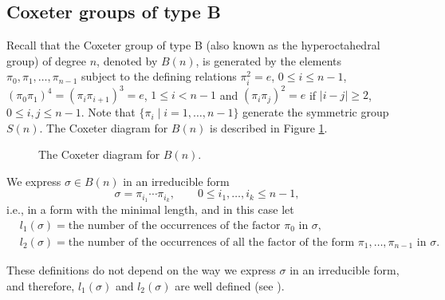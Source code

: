 \documentclass[11pt]{article}
\numberwithin{equation}{section}
\numberwithin{equation}{section}
\begin{document}
\subsection{Coxeter groups of type B}
Recall that the Coxeter
group of type B (also known as the hyperoctahedral group) of degree $n$, denoted by $B(n)$, is generated
by the elements $\pi_0, \pi_1, \dots , \pi_{n-1}$ subject to the defining relations $\pi_i^2=e$, $0\leq i \leq n-1$, $(\pi_0\pi_1)^4=(\pi_i \pi_{i+1})^3=e$, $1\leq i < n-1$ and $(\pi_i \pi_j)^2=e$ if $|i-j|\geq2$, $0\leq i,j\leq n-1$. Note that $\{\pi_i\mid i=1,\dots,n-1\}$ generate the symmetric group $S(n)$.
The Coxeter diagram for $B(n)$ is described in Figure \ref{fig:BN}.
\begin{figure}[htp]
\centering
		\caption{The Coxeter diagram for $B(n)$.}
		\label{fig:BN}
\end{figure}


We express $\sigma \in B(n)$ in an irreducible form
\[
\sigma=\pi_{i_1} \cdots \pi_{i_{k}}, \qquad 0\leq i_1,\dots,i_k \leq n-1,
\]
i.e., in a form with the minimal length, and in this case let
\begin{align*}
	&l_1(\sigma)= \text{the number of the occurrences of the factor $\pi_0$ in $\sigma$},
\\[1mm]
	&l_2(\sigma) = \text{the number of the occurrences of all the factor of the form $\pi_1,\dots,\pi_{n-1}$ in $\sigma$}.
\end{align*}

\begin{Remark}
These definitions do not depend on the way we express $\sigma$ in an irreducible form, and therefore, $l_1(\sigma)$ and $l_2(\sigma)$ are well defined (see \cite[Proposition~1]{BozejkoSzwarc2003}).
\end{Remark}

\setcounter{section}{2}
\end{document}

